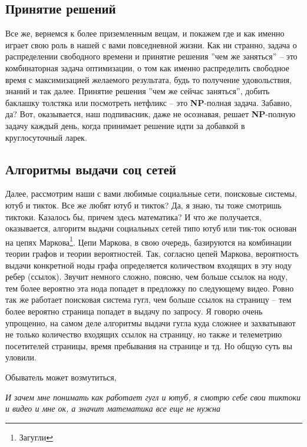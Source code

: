 \subsection{Принятие решений}\label{subsec:decision-making}
Все же, вернемся к более приземленным вещам, и покажем где и как именно играет свою роль в нашей с вами повседневной жизни.
Как ни странно, задача о распределении свободного времени и принятие решения ''чем же заняться'' -- это комбинаторная задача оптимизации,
о том как именно распределить свободное время с максимизацией желаемого результата,
будь то получение удовольствия, знаний и так далее.
Принятие решения ''чем же сейчас заняться'', добить баклашку толстяка или посмотреть нетфликс -- это \textbf{NP}-полная задача.
Забавно, да?
Вот, оказывается, наш подпивасник, даже не осознавая, решает \textbf{NP}-полную задачу каждый день,
когда принимает решение идти за добавкой в круглосуточный ларек.

\subsection{Алгоритмы выдачи соц сетей}\label{subsec:social-media}

Далее, рассмотрим наши с вами любимые социальные сети, поисковые системы, ютуб и тикток.
Все же любят ютуб и тикток?
Да, я знаю, ты тоже смотришь тиктоки.
Казалось бы, причем здесь математика?
И что же получается, оказывается, алгоритм выдачи социальных сетей типо ютуб или тик-ток основан на
цепях Маркова\footnote{Загугли}.
Цепи Маркова, в свою очередь, базируются на комбинации теории графов и теории вероятностей.
Так, согласно цепей Маркова, вероятность выдачи конкретной ноды графа определяется количеством входящих в эту
ноду ребер (ссылок).
Звучит немного сложно, поясню, чем больше ссылок на ноду, тем более вероятно эта нода попадет в предложку по следующему видео.
Ровно так же работает поисковая система гугл, чем больше ссылок на страницу -- тем более вероятно страница попадет в выдачу
по запросу.
Я говорю очень упрощенно, на самом деле алгоритмы выдачи гугла куда сложнее и захватывают
не только количество входящих ссылок на страницу, но также и телеметрию посетителей страницы,
время пребывания на странице и тд.
Но общую суть вы уловили.

Обыватель может возмутиться,

\begin{displayquote}
    \textit{
        И зачем мне понимать как работает гугл и ютуб, я смотрю себе свои тиктоки и видео и мне ок, а значит математика все еще не нужна
    }
\end{displayquote}

